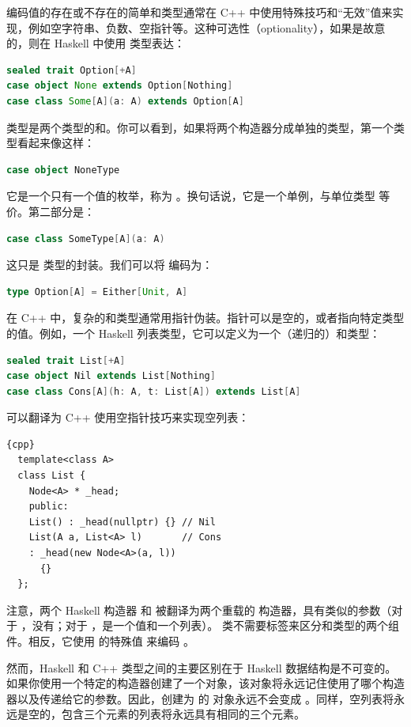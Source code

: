 编码值的存在或不存在的简单和类型通常在 C++ 中使用特殊技巧和“无效”值来实现，例如空字符串、负数、空指针等。这种可选性（optionality），如果是故意的，则在 Haskell 中使用  类型表达：

\begin{lstlisting}[language=Scala]
sealed trait Option[+A]
case object None extends Option[Nothing]
case class Some[A](a: A) extends Option[A]
\end{lstlisting}
 类型是两个类型的和。你可以看到，如果将两个构造器分成单独的类型，第一个类型看起来像这样：

\begin{lstlisting}[language=Scala]
case object NoneType
\end{lstlisting}
它是一个只有一个值的枚举，称为 。换句话说，它是一个单例，与单位类型 \code{()} 等价。第二部分是：

\begin{lstlisting}[language=Scala]
case class SomeType[A](a: A)
\end{lstlisting}
这只是  类型的封装。我们可以将  编码为：

\begin{lstlisting}[language=Scala]
type Option[A] = Either[Unit, A]
\end{lstlisting}
在 C++ 中，复杂的和类型通常用指针伪装。指针可以是空的，或者指向特定类型的值。例如，一个 Haskell 列表类型，它可以定义为一个（递归的）和类型：

\begin{lstlisting}[language=Scala]
sealed trait List[+A]
case object Nil extends List[Nothing]
case class Cons[A](h: A, t: List[A]) extends List[A]
\end{lstlisting}
可以翻译为 C++ 使用空指针技巧来实现空列表：

\begin{lstlisting}{cpp}
  template<class A>
  class List {
    Node<A> * _head;
    public:
    List() : _head(nullptr) {} // Nil
    List(A a, List<A> l)       // Cons
    : _head(new Node<A>(a, l))
      {}
  };
\end{lstlisting}
注意，两个 Haskell 构造器  和  被翻译为两个重载的  构造器，具有类似的参数（对于 ，没有；对于 ，是一个值和一个列表）。 类不需要标签来区分和类型的两个组件。相反，它使用  的特殊值  来编码 。

然而，Haskell 和 C++ 类型之间的主要区别在于 Haskell 数据结构是不可变的。如果你使用一个特定的构造器创建了一个对象，该对象将永远记住使用了哪个构造器以及传递给它的参数。因此，创建为  的  对象永远不会变成 。同样，空列表将永远是空的，包含三个元素的列表将永远具有相同的三个元素。

